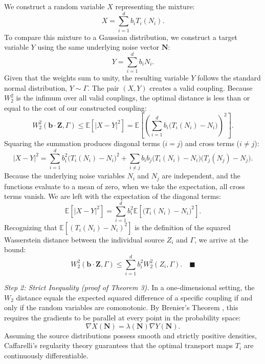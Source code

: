 \documentclass{tpm2026} %
\begin{document}
We construct a random variable $X$ representing the mixture:
\begin{equation}
    X = \sum_{i=1}^d b_i T_i(N_i).
\end{equation}
To compare this mixture to a Gaussian distribution, we construct a target variable $Y$ using the same underlying noise vector $\mathbf{N}$:
\begin{equation}
    Y = \sum_{i=1}^d b_i N_i.
\end{equation}
Given that the weights sum to unity, the resulting variable $Y$ follows the standard normal distribution, $Y \sim \Gamma$. 
The pair $(X, Y)$ creates a valid coupling. Because $W_2^2$ is the infimum over all valid couplings, the optimal distance is less than or equal to the cost of our constructed coupling:
\begin{equation}
    W_2^2(\mathbf{b} \cdot \mathbf{Z}, \Gamma) \le \mathbb{E}\left[|X - Y|^2\right] = \mathbb{E}\left[ \left( \sum_{i=1}^d b_i \big(T_i(N_i) - N_i\big) \right)^2 \right].
\end{equation}
Squaring the summation produces diagonal terms ($i=j$) and cross terms ($i \neq j$):
\begin{equation}
    |X - Y|^2 = \sum_{i=1}^d b_i^2 \big(T_i(N_i) - N_i\big)^2 + \sum_{i \neq j} b_i b_j \big(T_i(N_i) - N_i\big)\big(T_j(N_j) - N_j\big).
\end{equation}
Because the underlying noise variables $N_i$ and $N_j$ are independent, and the functions evaluate to a mean of zero, when we take the expectation, 
all cross terms vanish. We are left with the expectation of the diagonal terms:
\begin{equation}
    \mathbb{E}\left[|X - Y|^2\right] = \sum_{i=1}^d b_i^2 \mathbb{E}\left[ \big(T_i(N_i) - N_i\big)^2 \right].
\end{equation}
Recognizing that $\mathbb{E}[ (T_i(N_i) - N_i)^2 ]$ is the definition of the squared Wasserstein distance between the individual source $Z_i$ and $\Gamma$, we arrive at the bound:
\begin{equation}
    W_2^2(\mathbf{b} \cdot \mathbf{Z}, \Gamma) \le \sum_{i=1}^d b_i^2 W_2^2(Z_i, \Gamma). \quad \blacksquare
\end{equation}

\medskip\noindent\textit{Step 2: Strict Inequality (proof of Theorem 3).}
In a one-dimensional setting, the $W_2$ distance equals the expected squared difference of a specific coupling 
if and only if the random variables are comonotonic. By Brenier's Theorem \citep{brenier1991}, this requires the gradients 
to be parallel at every point in the probability space:
\begin{equation}
    \nabla X(\mathbf{N}) = \lambda(\mathbf{N}) \nabla Y(\mathbf{N}).
\end{equation}
Assuming the source distributions possess smooth and strictly positive densities, Caffarelli's regularity theory \citep{caffarelli1992} 
guarantees that the optimal transport maps $T_i$ are continuously differentiable. 
\end{document}
